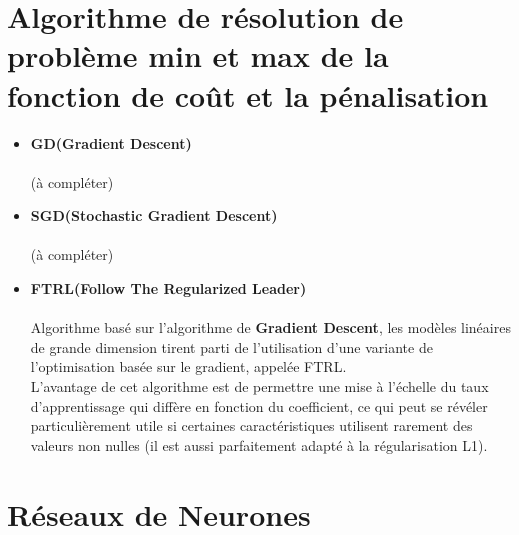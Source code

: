\documentclass[french]{article}
\begin{document}
	\section{Algorithme de résolution de problème min et max de la fonction de coût et la pénalisation}
	\begin{itemize}[label=\textbullet, font=\LARGE \color{red}]
	\item \textbf{GD(Gradient Descent)}\\\\
	(à compléter)\\
	\item \textbf{SGD(Stochastic Gradient Descent)}\\\\
	(à compléter)\\
    \item \textbf{FTRL(Follow The Regularized Leader)}\\\\
    Algorithme basé sur l'algorithme de \textbf{Gradient Descent}, les modèles linéaires de grande dimension tirent parti de l'utilisation d'une variante de l'optimisation basée sur le gradient, appelée FTRL. \\
    L'avantage de cet algorithme est de permettre une mise à l'échelle du taux d'apprentissage qui diffère en fonction du coefficient, ce qui peut se révéler particulièrement utile si certaines caractéristiques utilisent rarement des valeurs non nulles (il est aussi parfaitement adapté à la régularisation L1).
    \end{itemize}


\section{Réseaux de Neurones}
\end{document}
